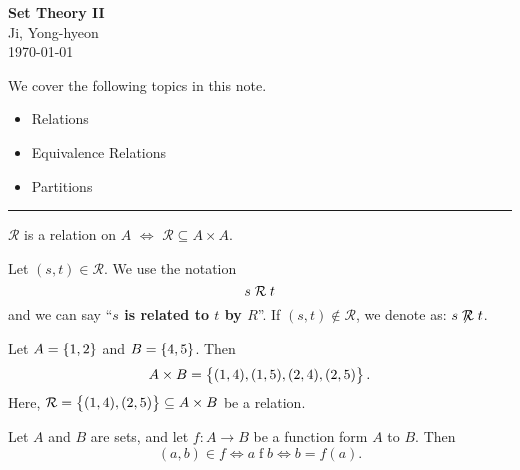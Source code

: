 \documentclass[11pt,openany]{article}
\begin{document}
\begin{center}
	\huge\textbf{Set Theory II}\\
	\vspace{0.5em}
	\large{Ji, Yong-hyeon}\\
	\vspace{0.5em}
	\normalsize{\today}\\
\end{center}

\noindent We cover the following topics in this note.
\begin{itemize}
	\item Relations
	\item Equivalence Relations
	\item Partitions
\end{itemize}
\hrule\vspace{12pt}
\begin{remark*}
	$\mathcal{R}$ is a relation on $A$ $\iff$ $\mathcal{R}\subseteq A\times A$.
\end{remark*}
\begin{note}[Notation]
	Let $(s,t)\in\mathcal{R}$. We use the notation  \[
	s\mathrel{\mathcal{R}} t
	\] and we can say ``\textbf{$s$ is related to $t$ by $R$}''. If $(s,t)\notin\mathcal{R}$, we denote as: $s\centernot\relation t$.
\end{note}
\vfill
\begin{example*}
	Let $A=\set{1,2}$ and $B=\set{4,5}$. Then \[
	A\times B=\set{(1,4),(1,5),(2,4),(2,5)}.
	\] Here, $\mathcal{R}=\set{(1,4),(2,5)}\subseteq A\times B$ be a relation.
	\begin{center}
	
	\end{center}
\end{example*}

\begin{example*}
	Let $A$ and $B$ are sets, and let $f:A\to B$ be a function form $A$ to $B$. Then \[
	(a,b)\in f\iff a\mathrel{f}b\iff b=f(a).
	\]
\end{example*}
\end{document}
